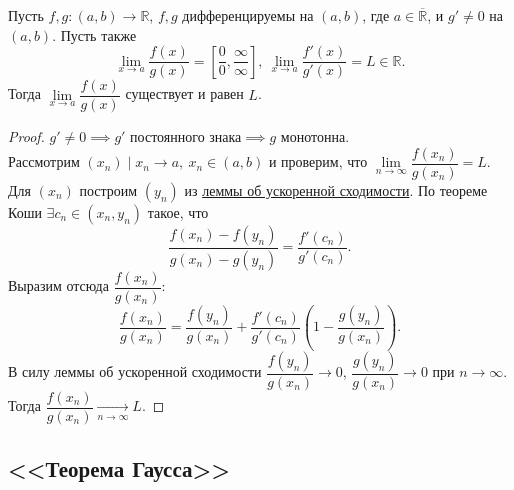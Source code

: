 \begin{theorem} \hypertarget{t3}{}
	Пусть $f, g \colon (a, b) \to \mathbb{R}$, $f, g$ дифференцируемы на $(a, b)$, где $a \in \overline{\mathbb{R}}$, и $g' \neq 0$ на $(a, b)$.
	Пусть также \[
	\lim_{x \to a} \frac{f(x)}{g(x)} = \left[ \frac00, \frac{\infty}{\infty} \right],
	~\lim_{x \to a} \frac{f'(x)}{g'(x)} = L \in \mathbb{R}.
	\]
	Тогда $\lim\limits_{x \to a} \dfrac{f(x)}{g(x)}$ существует и равен $L$.
\end{theorem}
\begin{proof}
	$g' \neq 0 \implies g' \text{ постоянного знака} \implies g \text{ монотонна}$. \\
	Рассмотрим $(x_n) \mid x_n \to a, ~x_n \in (a, b)$ и проверим, что $\lim\limits_{n \to \infty} \dfrac{f(x_n)}{g(x_n)} = L$.
	Для $(x_n)$ построим $(y_n)$ из \hyperlink{t2}{леммы об ускоренной сходимости}. По теореме Коши
	$\exists c_n \in (x_n, y_n)$ такое, что \[
	\frac{f(x_n) - f(y_n)}{g(x_n) - g(y_n)} = \frac{f'(c_n)}{g'(c_n)}.
	\]
	Выразим отсюда $\dfrac{f(x_n)}{g(x_n)}$: \[
	\frac{f(x_n)}{g(x_n)} = \frac{f(y_n)}{g(x_n)} + \frac{f'(c_n)}{g'(c_n)} \left(1 - \frac{g(y_n)}{g(x_n)} \right).
	\]
	В силу леммы об ускоренной сходимости $\dfrac{f(y_n)}{g(x_n)} \to 0$, $\dfrac{g(y_n)}{g(x_n)} \to 0$ при \(n \to \infty\). Тогда $\dfrac{f(x_n)}{g(x_n)} \xrightarrow[n \to \infty]{} L$.
\end{proof}

\subsection{\color{red} <<Теорема Гаусса>>}


